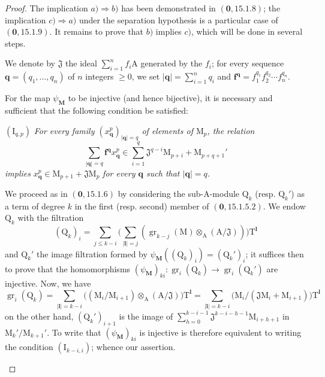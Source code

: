 \begin{proof}
The implication $a)\Rightarrow b)$ has been demonstrated in $(\mathbf{0},15.1.8)$; the implication $c)\Rightarrow a)$ under the separation hypothesis is a particular case of $(\mathbf{0},15.1.9)$. It remains to prove that $b)$ implies $c)$, which will be done in several steps.

We denote by $\mathfrak{J}$ the ideal $\sum_{i=1}^{n}f_i\mathrm{A}$ generated by the $f_i$; for every sequence $\mathbf{q}=(q_1,\ldots,q_n)$ of $n$ integers $\geqslant 0$, we set $|\mathbf{q}|=\sum_{i=1}^{n}q_i$ and $\mathbf{f}^\mathbf{q}=f_1^{q_1}f_2^{q_2}\cdots f_n^{q_n}$.

\begin{env}[19.5.5.1]
\label{IV.19.5.5.1}
For the map $\psi_\mathbf{M}$ to be injective (and hence bijective), it is necessary and sufficient that the following condition be satisfied:

$(\mathrm{I}_{q,p})$ \emph{For every family $(x_\mathbf{q}^p)_{|\mathbf{q}|=q}$ of elements of $\mathrm{M}_p$, the relation}
\[
  \textstyle\sum_{|\mathbf{q}|=q}\mathbf{f}^\mathbf{q} x_\mathbf{q}^p\in\textstyle\sum_{i=1}^{q}\mathfrak{J}^{q-i}\mathrm{M}_{p+i}+\mathrm{M}_{p+q+1}'
\]
\emph{implies} $x_\mathbf{q}^p\in\mathrm{M}_{p+1}+\mathfrak{J}\mathrm{M}_p$ \emph{for every $\mathbf{q}$ such that $|\mathbf{q}|=q$.}

We proceed as in $(\mathbf{0},15.1.6)$ by considering the sub-$\mathrm{A}$-module $\mathrm{Q}_k$ (resp. $\mathrm{Q}_k'$) as a term of degree $k$ in the first (resp. second) member of $(\mathbf{0},15.1.5.2)$. We endow $\mathrm{Q}_k$ with the filtration
\[
  (\mathrm{Q}_k)_i=\textstyle\sum_{j\leqslant k-i}\bigl(\textstyle\sum_{|\mathbf{l}|=j}(\operatorname{gr}_{k-j}(\mathrm{M})\otimes_\mathrm{A}(\mathrm{A}/\mathfrak{J}))\bigr)\mathrm{T}^\mathbf{l}
\]
and $\mathrm{Q}_k'$ the image filtration formed by $\psi_\mathbf{M}((\mathrm{Q}_k)_i)=(\mathrm{Q}_k')_i$; it suffices then to prove that the homomorphisms $(\psi_\mathbf{M})_{ki}:\operatorname{gr}_i(\mathrm{Q}_k)\to\operatorname{gr}_i(\mathrm{Q}_k')$ are injective. Now, we have
\[
  \operatorname{gr}_i(\mathrm{Q}_k)=\textstyle\sum_{|\mathbf{l}|=k-i}\bigl((\mathrm{M}_i/\mathrm{M}_{i+1})\otimes_\mathrm{A}(\mathrm{A}/\mathfrak{J})\bigr)\mathrm{T}^\mathbf{l}
  =\textstyle\sum_{|\mathbf{l}|=k-i}\bigl(\mathrm{M}_i/(\mathfrak{J}\mathrm{M}_i+\mathrm{M}_{i+1})\bigr)\mathrm{T}^\mathbf{l}
\]
on the other hand, $(\mathrm{Q}_k')_{i+1}$ is the image of $\sum_{h=0}^{k-i-1}\mathfrak{J}^{k-i-h-1}\mathrm{M}_{i+h+1}$ in $\mathrm{M}_k'/\mathrm{M}_{k+1}'$. To write that $(\psi_\mathbf{M})_{ki}$ is injective is therefore equivalent to writing the condition $(\mathrm{I}_{k-i,i})$; whence our assertion.
\end{env}


\end{proof}
